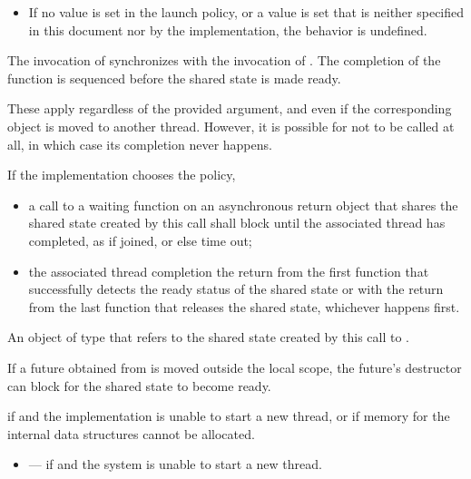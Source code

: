 \begin{itemdescr}
\begin{itemize}
\recommended
If this policy is specified together with other policies, such as when using a
 value of , implementations should defer
invocation or the selection of the policy when no more concurrency can be effectively
exploited.

\item
If no value is set in the launch policy, or a value is set that is neither specified
in this document nor by the implementation, the behavior is undefined.
\end{itemize}

\pnum
\sync
The invocation of  synchronizes with the invocation of .
The completion of the function  is sequenced before
the shared state is made ready.
\begin{note}
These apply regardless of the provided  argument, and
even if the corresponding  object is moved to another thread.
However, it is possible for  not to be called at all,
in which case its completion never happens.
\end{note}

If the implementation chooses the  policy,
\begin{itemize}
\item
a call to a waiting function on an asynchronous return
object that shares the shared state created by this  call shall
block until the associated thread has completed, as if joined, or else time
out;
\item
the associated thread completion
the return from
the first function
that successfully detects the ready status of the shared state or
with the return from the last
function that releases the shared state, whichever
happens first.
\end{itemize}

\pnum
\returns
An object of type
 that refers
to the shared state created by this call to .
\begin{note}
If a future obtained from  is moved outside the local scope,
the future's destructor can block for the shared state to become ready.
\end{note}

\pnum
\throws
{} if  and the
implementation is unable to start a new thread, or
 if memory for the internal data structures
cannot be allocated.

\pnum
\errors
\begin{itemize}
\item {} --- if
 and the system is unable to start a new thread.
\end{itemize}
\end{itemdescr}

